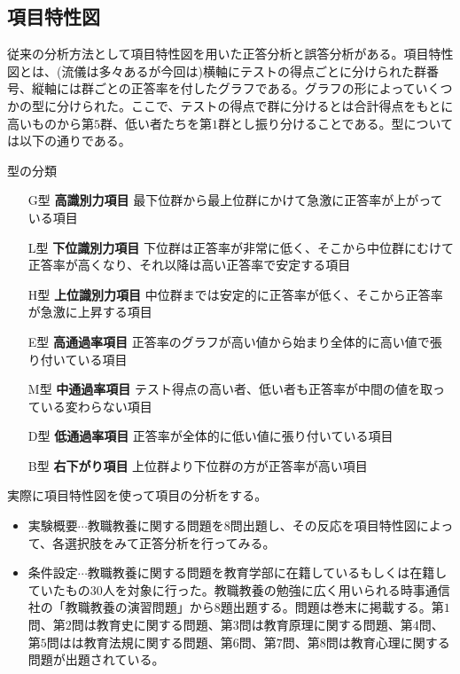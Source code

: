 \documentclass[12pt]{jarticle}
\numberwithin{equation}{subsection}
\begin{document}
\subsection{項目特性図} 従来の分析方法として項目特性図を用いた正答分析と誤答分析がある。項目特性図とは、(流儀は多々あるが今回は)横軸にテストの得点ごとに分けられた群番号、縦軸には群ごとの正答率を付したグラフである。グラフの形によっていくつかの型に分けられた。ここで、テストの得点で群に分けるとは合計得点をもとに高いものから第$5$群、低い者たちを第$1$群とし振り分けることである。型については以下の通りである。
\begin{itembox}[l]{型の分類}
  \begin{itemize}
    \item[G型]  {\bf 高識別力項目}\quad
最下位群から最上位群にかけて急激に正答率が上がっている項目\vspace{-1mm}
    \item[L型]  {\bf 下位識別力項目}\quad
下位群は正答率が非常に低く、そこから中位群にむけて正答率が高くなり、それ以降は高い正答率で安定する項目\vspace{-1mm}
    \item[H型]  {\bf 上位識別力項目}\quad
中位群までは安定的に正答率が低く、そこから正答率が急激に上昇する項目\vspace{-1mm}
    \item[E型]  {\bf 高通過率項目}\quad
正答率のグラフが高い値から始まり全体的に高い値で張り付いている項目\vspace{-1mm}
    \item[M型]  {\bf 中通過率項目}\quad
テスト得点の高い者、低い者も正答率が中間の値を取っている変わらない項目\vspace{-1mm}
    \item[D型]  {\bf 低通過率項目}\quad
正答率が全体的に低い値に張り付いている項目\vspace{-1mm}
    \item[B型]  {\bf 右下がり項目}\quad
上位群より下位群の方が正答率が高い項目\vspace{-1mm}
  \end{itemize}
\end{itembox}
実際に項目特性図を使って項目の分析をする。
\begin{itemize}
  \item 実験概要$\cdots$教職教養に関する問題を$8$問出題し、その反応を項目特性図によって、各選択肢をみて正答分析を行ってみる。
  \item 条件設定$\cdots$教職教養に関する問題を教育学部に在籍しているもしくは在籍していたもの$30$人を対象に行った。教職教養の勉強に広く用いられる時事通信社の「教職教養の演習問題」から$8$題出題する。問題は巻末に掲載する。第$1$問、第$2$問は教育史に関する問題、第$3$問は教育原理に関する問題、第$4$問、第$5$問はは教育法規に関する問題、第$6$問、第$7$問、第$8$問は教育心理に関する問題が出題されている。
\end{itemize}
\end{document}
